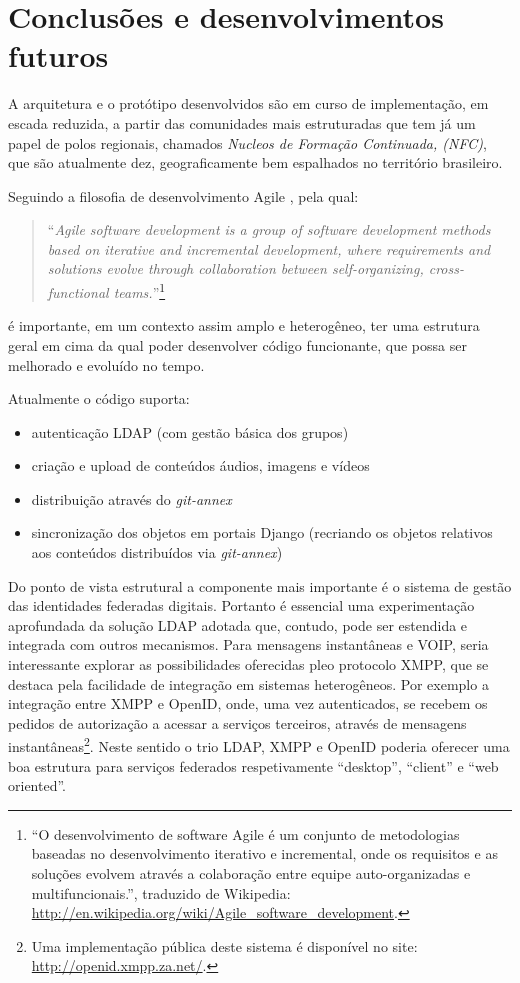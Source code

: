 
\chapter{Conclusões e desenvolvimentos futuros}
\label{Capitulo5}

A arquitetura e o protótipo desenvolvidos são em curso de
implementação, em escada reduzida, a partir das comunidades mais
estruturadas que tem já um papel de polos regionais, chamados
\emph{Nucleos de Formação Continuada, (NFC)}, que são atualmente dez,
geograficamente bem espalhados no território brasileiro.

Seguindo a filosofia de desenvolvimento Agile \citep{Agile}, pela qual: 

\begin{quote}
  ``\emph{Agile software development is a group of software
    development methods based on iterative and incremental
    development, where requirements and solutions evolve through
    collaboration between self-organizing, cross-functional
    teams.}''\footnote{``O desenvolvimento de software Agile é um
    conjunto de metodologias baseadas no desenvolvimento iterativo e
    incremental, onde os requisitos e as soluções evolvem através a
    colaboração entre equipe auto-organizadas e multifuncionais.'',
    traduzido de Wikipedia:
    \url{http://en.wikipedia.org/wiki/Agile_software_development}.}
\end{quote}

é importante, em um contexto assim amplo e heterogêneo, ter uma
estrutura geral em cima da qual poder desenvolver código funcionante,
que possa ser melhorado e evoluído no tempo.

Atualmente o código suporta:
\begin{itemize}
\item autenticação LDAP (com gestão básica dos grupos)
\item criação e upload de conteúdos áudios, imagens e vídeos
\item distribuição através do \emph{git-annex}
\item sincronização dos objetos em portais Django (recriando os
  objetos relativos aos conteúdos distribuídos via \emph{git-annex})
\end{itemize}

Do ponto de vista estrutural a componente mais importante é o sistema
de gestão das identidades federadas digitais. Portanto é essencial uma
experimentação aprofundada da solução LDAP adotada que, contudo, pode
ser estendida e integrada com outros mecanismos. Para mensagens
instantâneas e VOIP, seria interessante explorar as possibilidades
oferecidas pleo protocolo XMPP, que se destaca pela facilidade de
integração em sistemas heterogêneos. Por exemplo a integração entre
XMPP e OpenID, onde, uma vez autenticados, se recebem os pedidos de
autorização a acessar a serviços terceiros, através de mensagens
instantâneas\footnote{Uma implementação pública deste sistema é
  disponível no site: \url{http://openid.xmpp.za.net/}.}. Neste
sentido o trio LDAP, XMPP e OpenID poderia oferecer uma boa estrutura
para serviços federados respetivamente ``desktop'', ``client'' e ``web
oriented''.

